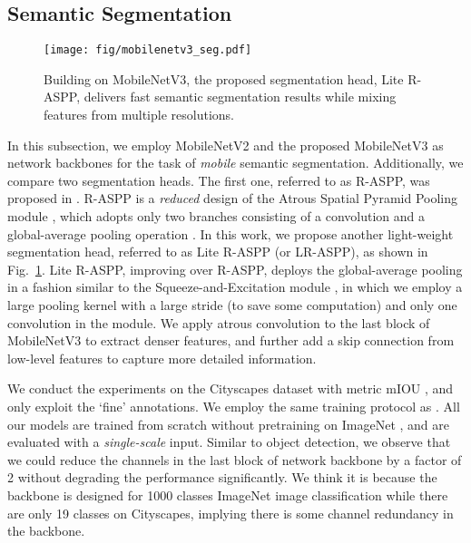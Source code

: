 \documentclass[10pt,twocolumn,letterpaper]{article}
\begin{document}
\subsection{Semantic Segmentation}

\begin{figure}[!t]
    \centering
    \texttt{[image: fig/mobilenetv3\_seg.pdf]}
    \caption{Building on MobileNetV3, the proposed segmentation head, Lite R-ASPP, delivers fast semantic segmentation results while mixing features from multiple resolutions.}
    \label{fig:mobilenetv3_seg}
\end{figure}

In this subsection, we employ MobileNetV2 \cite{mobilenetv2} and the proposed MobileNetV3 as network backbones for the task of {\it mobile} semantic segmentation. Additionally, we compare two segmentation heads. The first one, referred to as R-ASPP, was proposed in \cite{mobilenetv2}. R-ASPP is a {\it reduced} design of the Atrous Spatial Pyramid Pooling module \cite{DeepLabV2, DeepLabV3,DeepLabV3Plus}, which adopts only two branches consisting of a  convolution and a global-average pooling operation \cite{ParseNet,zhao2017pyramid}. In this work, we propose another light-weight segmentation head, referred to as Lite R-ASPP (or LR-ASPP), as shown in Fig.~\ref{fig:mobilenetv3_seg}. Lite R-ASPP, improving over R-ASPP, deploys the global-average pooling in a fashion similar to the Squeeze-and-Excitation module \cite{squeezeandexcite}, in which we employ a large pooling kernel with a large stride (to save some computation) and only one  convolution in the module. We apply atrous convolution \cite{Holschneider1989real,Sermanet2013Overfeat,Papandreou2014untangling,DeepLabV1} to the last block of MobileNetV3 to extract denser features, and further add a skip connection \cite{long2014fully} from low-level features to capture more detailed information.

We conduct the experiments on the Cityscapes dataset \cite{Cordts2016Cityscapes} with metric mIOU \cite{PASCAL}, and only exploit the `fine' annotations. We employ the same training protocol as \cite{DeepLabV3, mobilenetv2}. All our models are trained from scratch without pretraining on ImageNet \cite{russakovsky:2015:ILS:2846547.2846559}, and are evaluated with a {\it single-scale} input. Similar to object detection, we observe that we could reduce the channels in the last block of network backbone by a factor of 2 without degrading the performance significantly. We think it is because the backbone is designed for 1000 classes ImageNet image classification \cite{russakovsky:2015:ILS:2846547.2846559} while there are only 19 classes on Cityscapes, implying there is some channel redundancy in the backbone.
\end{document}
